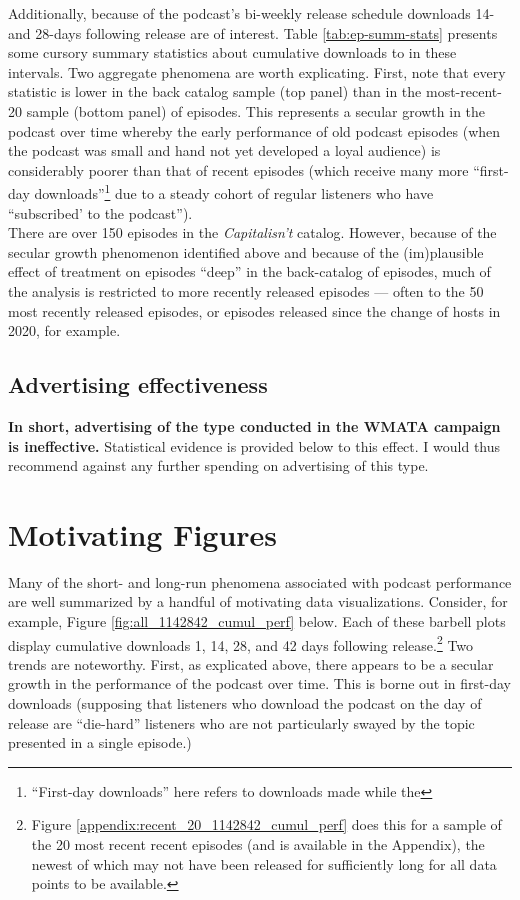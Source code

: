 \documentclass[11pt, letterpaper, twoside]{article}
\begin{document}
Additionally, because of the podcast's bi-weekly release schedule downloads 14- and 28-days following release are of interest. Table \ref{tab:ep-summ-stats} presents some cursory summary statistics about cumulative downloads to in these intervals. Two aggregate phenomena are worth explicating. First, note that every statistic is lower in the back catalog sample (top panel) than in the most-recent-20 sample (bottom panel) of episodes. This represents a secular growth in the podcast over time whereby the early performance of old podcast episodes (when the podcast was small and hand not yet developed a loyal audience) is considerably poorer than that of recent episodes (which receive many more ``first-day downloads''\footnote{``First-day downloads'' here refers to downloads made while the } due to a steady cohort of regular listeners who have ``subscribed' to the podcast'').\\



There are over 150 episodes in the \textit{Capitalisn't} catalog. However, because of the secular growth phenomenon identified above and because of the (im)plausible effect of treatment on episodes ``deep'' in the back-catalog of episodes, much of the analysis is restricted to more recently released episodes --- often to the 50 most recently released episodes, or episodes released since the change of hosts in 2020, for example.

\subsection{Advertising effectiveness}
\textbf{In short, advertising of the type conducted in the WMATA campaign is ineffective.} Statistical evidence is provided below to this effect. I would thus recommend against any further spending on advertising of this type.

\section{Motivating Figures}
Many of the short- and long-run phenomena associated with podcast performance are well summarized by a handful of motivating data visualizations. Consider, for example, Figure \ref{fig:all_1142842_cumul_perf} below. Each of these barbell plots display cumulative downloads 1, 14, 28, and 42 days following release.\footnote{Figure \ref{appendix:recent_20_1142842_cumul_perf} does this for a sample of the 20 most recent recent episodes (and is available in the Appendix), the newest of which may not have been released for sufficiently long for all data points to be available.} Two trends are noteworthy. First, as explicated above, there appears to be a secular growth in the performance of the podcast over time. This is borne out in first-day downloads (supposing that listeners who download the podcast on the day of release are ``die-hard'' listeners who are not particularly swayed by the topic presented in a single episode.)
\end{document}
